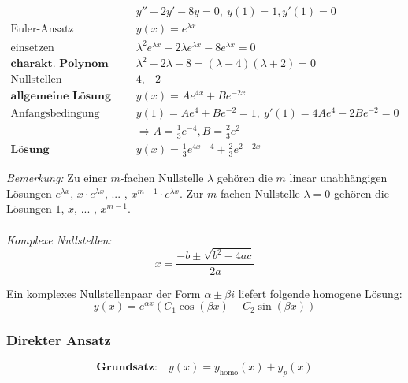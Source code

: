 \documentclass[11pt]{article}
\begin{document}
\begin{equation*}
\begin{split}
	& y'' - 2y' - 8y = 0,\ y(1) = 1, y'(1) = 0 \\
	\text{Euler-Ansatz}\quad & y(x) = e^{\lambda x} \\
	\text{einsetzen}\quad & \lambda^2 e^{\lambda x} - 2\lambda e^{\lambda x} - 8e^{\lambda x} = 0 \\
	\textbf{charakt. Polynom}\quad & \lambda^2 - 2\lambda - 8 = (\lambda - 4)(\lambda + 2) = 0 \\
	\text{Nullstellen}\quad & 4, -2 \\
	\textbf{allgemeine L{\"o}sung}\quad & y(x) = Ae^{4x} + Be^{-2x} \\
	\text{Anfangsbedingung gebrauchen}\quad & y(1) = Ae^4 + Be^{-2} = 1,\ y'(1) = 4Ae^4 - 2Be^{-2} = 0 \\
											& \Rightarrow A = \frac{1}{3}e^{-4}, B = \frac{2}{3}e^2 \\
	\textbf{L{\"o}sung}\quad & y(x) = \frac{1}{3}e^{4x-4} + \frac{2}{3}e^{2-2x}
\end{split}
\end{equation*}

\emph{Bemerkung:} Zu einer $m$-fachen Nullstelle $\lambda$ geh{\"o}ren die $m$ linear unabh{\"a}ngigen L{\"o}sungen $e^{\lambda x}$, $x\cdot e^{\lambda x}$, ... , $x^{m-1}\cdot e^{\lambda x}$. Zur $m$-fachen Nullstelle $\lambda = 0$ geh{\"o}ren die L{\"o}sungen $1$, $x$, ... , $x^{m-1}$. \\
\\ 
\emph{Komplexe Nullstellen:} \\

\begin{equation*}
	x = \frac{-b \pm \sqrt{b^2-4ac}}{2a}
\end{equation*}

Ein komplexes Nullstellenpaar der Form $\alpha \pm \beta i$ liefert folgende homogene Lösung:
\begin{equation*}
	y(x)=e^{\alpha x}(C_1\cos(\beta x) + C_2\sin(\beta x))
\end{equation*}

\subsubsection{Direkter Ansatz}

\begin{equation*}
	\textbf{Grundsatz:}\quad y(x) = y_\text{homo}(x) + y_p(x)
\end{equation*}
\end{document}
